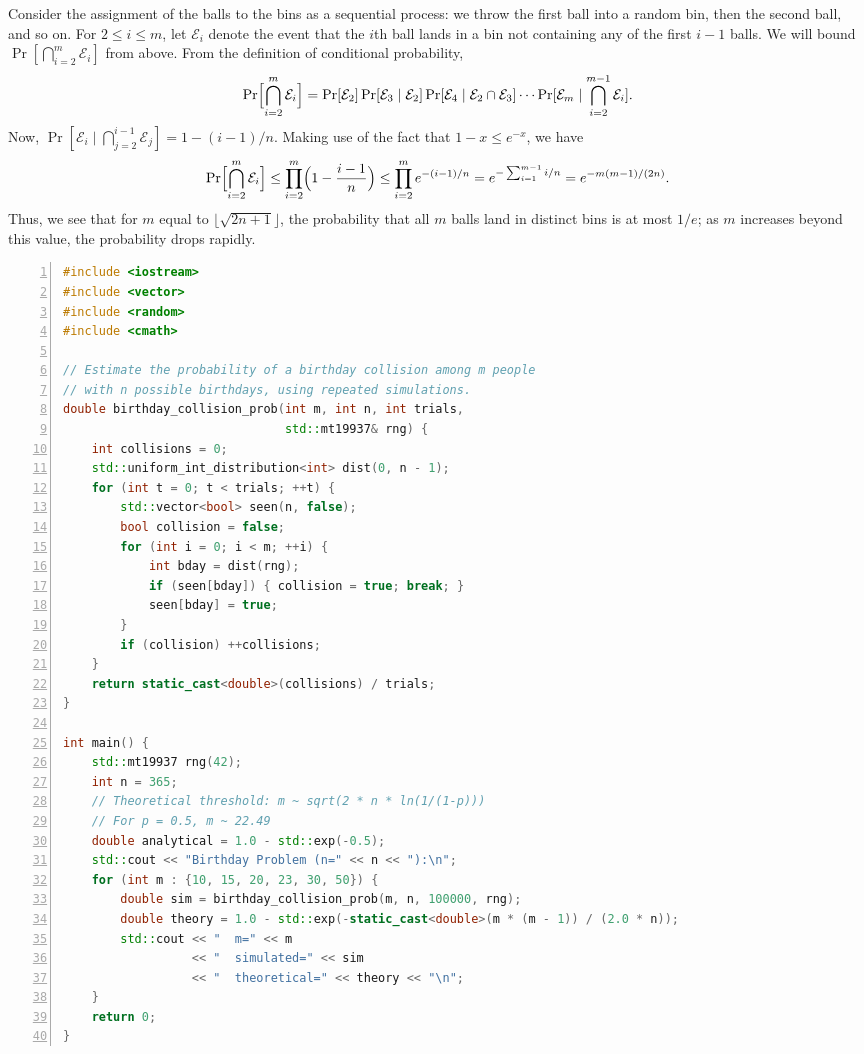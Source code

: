 \documentclass[twoside,12pt]{book}
\theoremstyle{plain}
\theoremstyle{definition}
\theoremstyle{remark}
\newenvironment{cpplisting}{\begin{center}\small}{\end{center}}
\begin{document}
Consider the assignment of the balls to the bins as a sequential process: we throw the first ball into a random bin, then the second ball, and so on. For $2 \leq i \leq m$, let $\mathcal{E}_i$ denote the event that the $i$th ball lands in a bin not containing any of the first $i-1$ balls. We will bound $\Pr[\bigcap_{i=2}^{m} \mathcal{E}_i]$ from above. From the definition of conditional probability,
\[
\Pr\Bigl[\bigcap_{i=2}^{m} \mathcal{E}_i\Bigr] = \Pr[\mathcal{E}_2] \Pr[\mathcal{E}_3 \mid \mathcal{E}_2] \Pr[\mathcal{E}_4 \mid \mathcal{E}_2 \cap \mathcal{E}_3] \cdots \Pr[\mathcal{E}_m \mid \bigcap_{i=2}^{m-1} \mathcal{E}_i].
\]
Now, $\Pr[\mathcal{E}_i \mid \bigcap_{j=2}^{i-1} \mathcal{E}_j] = 1 - (i-1)/n$. Making use of the fact that $1 - x \leq e^{-x}$, we have
\[
\Pr\Bigl[\bigcap_{i=2}^{m} \mathcal{E}_i\Bigr] \leq \prod_{i=2}^{m}\Bigl(1 - \frac{i-1}{n}\Bigr) \leq \prod_{i=2}^{m} e^{-(i-1)/n} = e^{-\sum_{i=1}^{m-1} i/n} = e^{-m(m-1)/(2n)}.
\]
Thus, we see that for $m$ equal to $\lfloor \sqrt{2n+1} \rfloor$, the probability that all $m$ balls land in distinct bins is at most $1/e$; as $m$ increases beyond this value, the probability drops rapidly.

\begin{cpplisting}
\label{code:birthday}
\begin{lstlisting}[language=C++, frame=single, framerule=0.4pt,
  rulecolor=\color{gray}, backgroundcolor=\color{gray!5},
  basicstyle=\ttfamily\footnotesize, keywordstyle=\bfseries,
  commentstyle=\itshape\color{gray}, numbers=left,
  numberstyle=\tiny\color{gray}, numbersep=8pt,
  tabsize=2, showstringspaces=false]
#include <iostream>
#include <vector>
#include <random>
#include <cmath>

// Estimate the probability of a birthday collision among m people
// with n possible birthdays, using repeated simulations.
double birthday_collision_prob(int m, int n, int trials,
                               std::mt19937& rng) {
    int collisions = 0;
    std::uniform_int_distribution<int> dist(0, n - 1);
    for (int t = 0; t < trials; ++t) {
        std::vector<bool> seen(n, false);
        bool collision = false;
        for (int i = 0; i < m; ++i) {
            int bday = dist(rng);
            if (seen[bday]) { collision = true; break; }
            seen[bday] = true;
        }
        if (collision) ++collisions;
    }
    return static_cast<double>(collisions) / trials;
}

int main() {
    std::mt19937 rng(42);
    int n = 365;
    // Theoretical threshold: m ~ sqrt(2 * n * ln(1/(1-p)))
    // For p = 0.5, m ~ 22.49
    double analytical = 1.0 - std::exp(-0.5);
    std::cout << "Birthday Problem (n=" << n << "):\n";
    for (int m : {10, 15, 20, 23, 30, 50}) {
        double sim = birthday_collision_prob(m, n, 100000, rng);
        double theory = 1.0 - std::exp(-static_cast<double>(m * (m - 1)) / (2.0 * n));
        std::cout << "  m=" << m
                  << "  simulated=" << sim
                  << "  theoretical=" << theory << "\n";
    }
    return 0;
}
\end{lstlisting}
\end{cpplisting}
\end{document}
